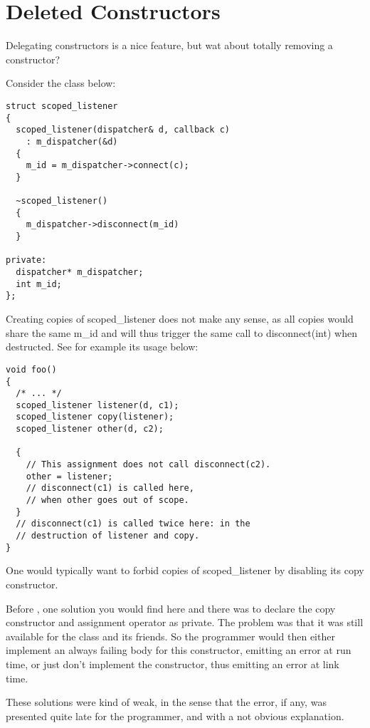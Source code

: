 \section{Deleted Constructors}

Delegating constructors is a nice feature, but wat about totally
removing a constructor?

Consider the class below:

\begin{lstlisting}
struct scoped_listener
{
  scoped_listener(dispatcher& d, callback c)
    : m_dispatcher(&d)
  {
    m_id = m_dispatcher->connect(c);
  }

  ~scoped_listener()
  {
    m_dispatcher->disconnect(m_id)
  }

private:
  dispatcher* m_dispatcher;
  int m_id;
};
\end{lstlisting}

Creating copies of scoped\_listener does not make any sense, as all
copies would share the same m\_id and will thus trigger the same call
to disconnect(int) when destructed. See for example its usage below:

\begin{lstlisting}
void foo()
{
  /* ... */
  scoped_listener listener(d, c1);
  scoped_listener copy(listener);
  scoped_listener other(d, c2);

  {
    // This assignment does not call disconnect(c2).
    other = listener;
    // disconnect(c1) is called here,
    // when other goes out of scope.
  }
  // disconnect(c1) is called twice here: in the
  // destruction of listener and copy.
}
\end{lstlisting}

One would typically want to forbid copies of scoped\_listener by
disabling its copy constructor.

Before , one solution you would find here and there was to
declare the copy constructor and assignment operator as private. The
problem was that it was still available for the class and its
friends. So the programmer would then either implement an always
failing body for this constructor, emitting an error at run time, or
just don't implement the constructor, thus emitting an error at link
time.

These solutions were kind of weak, in the sense that the error, if
any, was presented quite late for the programmer, and with a not
obvious explanation.

